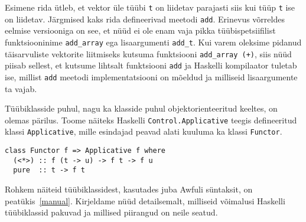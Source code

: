 \documentclass[12pt]{article}
\begin{document}
      Esimene rida ütleb, et vektor üle tüübi \verb!t! on liidetav parajasti siis kui tüüp \verb!t! ise on liidetav. Järgmised kaks rida defineerivad meetodi \verb!add!. Erinevus võrreldes eelmise versiooniga on see, et nüüd ei ole enam vaja pikka tüübispetsiifilist funktsiooninime \verb!add_array! ega lisaargumenti \verb!add_t!. Kui varem oleksime pidanud täisarvuliste vektorite liitmiseks kutsuma funktsiooni \verb!add_array (+)!, siis nüüd piisab sellest, et kutsume lihtsalt funktsiooni \verb!add! ja Haskelli kompilaator tuletab ise, millist \verb!add! meetodi implementatsiooni on mõeldud ja milliseid lisaargumente ta vajab.

      Tüübiklasside puhul, nagu ka klasside puhul objektorienteeritud keeltes, on olemas pärilus. Toome näiteks Haskelli \verb!Control.Applicative! teegis defineeritud klassi \verb!Applicative!, mille esindajad peavad alati kuuluma ka klassi \verb!Functor!.

      \begin{verbatim}class Functor f => Applicative f where
  (<*>) :: f (t -> u) -> f t -> f u
  pure  :: t -> f t\end{verbatim}

      Rohkem näiteid tüübiklassidest, kasutades juba Awfuli süntaksit, on peatükis~\ref{manual}. Kirjeldame nüüd detailsemalt, milliseid võimalusi Haskelli tüübiklassid pakuvad ja millised piirangud on neile seatud.
\end{document}
